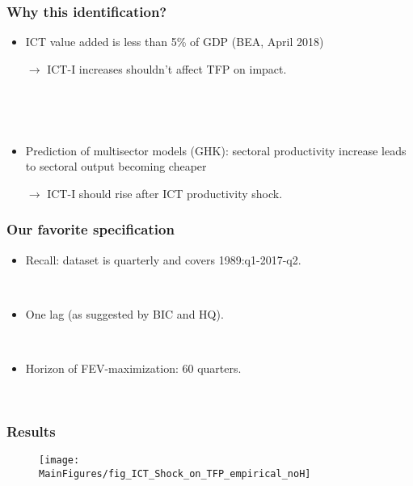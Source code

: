 \documentclass{beamer}
\def \MainFigures{../Draft_Summer2018/MainFigures}
\begin{document}
\begin{frame}
	\frametitle{Why this identification?}
	
	\begin{itemize}
	\item ICT value added is less than 5\% of GDP (BEA, April 2018) 
	
	$\rightarrow$ ICT-I increases shouldn't affect TFP on impact.
	
	\
	
	\
	
	\item Prediction of multisector models (GHK): sectoral productivity increase leads to sectoral output becoming cheaper 
	
	$\rightarrow$ ICT-I should rise after ICT productivity shock.
	\end{itemize}

\end{frame}
\begin{frame}
	\frametitle{Our favorite specification}
	
	\begin{itemize}
	\item Recall: dataset is quarterly and covers 1989:q1-2017-q2.
	
	\
	
	\item One lag (as suggested by BIC and HQ).
	
	\
	
	\item Horizon of FEV-maximization: 60 quarters.
	
	\
	
	
	\end{itemize}

	
\end{frame}

\begin{frame}
	\frametitle{Results}
	
\begin{figure}[h!]
\begin{center}
\texttt{[image: \\MainFigures/fig\_ICT\_Shock\_on\_TFP\_empirical\_noH]}
\label{fig:TFP_main}
\end{center}
\end{figure}
	

\end{frame}
\end{document}
